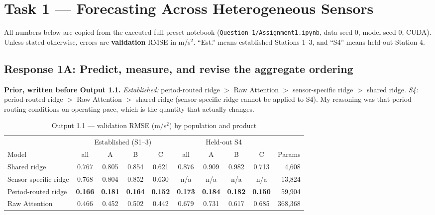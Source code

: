 \section*{Task 1 --- Forecasting Across Heterogeneous Sensors}
All numbers below are copied from the executed full-preset notebook (\texttt{Question\_1/Assignment1.ipynb}, data seed 0, model seed 0, CUDA). Unless stated otherwise, errors are \textbf{validation} RMSE in m/s$^2$. ``Est.'' means established Stations 1--3, and ``S4'' means held-out Station 4.

\subsection*{Response 1A: Predict, measure, and revise the aggregate ordering}
\textbf{Prior, written before Output 1.1.} \emph{Established:} period-routed ridge $>$ Raw Attention $>$ sensor-specific ridge $>$ shared ridge. \emph{S4:} period-routed ridge $>$ Raw Attention $>$ shared ridge (sensor-specific ridge cannot be applied to S4). My reasoning was that period routing conditions on operating pace, which is the quantity that actually changes.

\begin{table}[H]\centering\small
\caption*{Output 1.1 --- validation RMSE (m/s$^2$) by population and product}
\begin{tabular}{lcccc|cccc|r}\toprule
 & \multicolumn{4}{c|}{Established (S1--3)} & \multicolumn{4}{c|}{Held-out S4} & \\
Model & all & A & B & C & all & A & B & C & Params\\\midrule
Shared ridge & 0.767 & 0.805 & 0.854 & 0.621 & 0.876 & 0.909 & 0.982 & 0.713 & 4,608\\
Sensor-specific ridge & 0.768 & 0.804 & 0.852 & 0.630 & n/a & n/a & n/a & n/a & 13,824\\
Period-routed ridge & \textbf{0.166} & \textbf{0.181} & \textbf{0.164} & \textbf{0.152} & \textbf{0.173} & \textbf{0.184} & \textbf{0.182} & \textbf{0.150} & 59,904\\
Raw Attention & 0.466 & 0.452 & 0.502 & 0.442 & 0.679 & 0.731 & 0.617 & 0.685 & 368,368\\\bottomrule
\end{tabular}\end{table}

